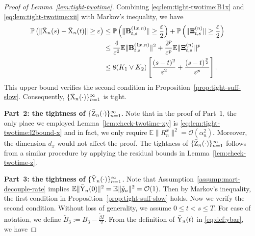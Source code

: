 \documentclass[11pt]{article}
\theoremstyle{plain}
\theoremstyle{definition}
\def\invdiffslow{\tilde{\beta}}
\def\eps{{\varepsilon}}
\def\mI{{\bm{I}}}
\def\OM{{\mathcal O}}
\def\EB{{\mathbb E}}
\def\PB{{\mathbb P}}
\newcommand{\ycheck}{{\check{y}}}
\newcommand{\xbar}{{\bar{\textnormal{X}}}}
\newcommand{\ybar}{{\bar{\textnormal{Y}}}}
\newcommand{\zbar}{{\bar{\textnormal{Z}}}}
\def\mI{{I}}
\def\Xii{\mbox{\boldmath$\Xi$\unboldmath}}
\def\bfB{{\bf B}}
\begin{document}
\begin{appendix}
\begin{proof}[Proof of Lemma~\ref{lem:tight-twotime}]
Combining \eqref{eq:lem:tight-twotime:B1x} and \eqref{eq:lem:tight-twotime:xii} with Markov's inequality, 
we have
\begin{align*}
    \PB \left( 
    \| \xbar_{n}(s) - \xbar_{n}(t) \| \ge \eps \right)
    & \le \PB \left( 
    \| \bfB^{(1x,n)}_{t,s} \| \ge \frac{\eps}{2} \right) + \PB \left( 
    \| \Xii^{(n)}_{t,s} \| \ge \frac{\eps}{2} \right) 
    \\
    & \le \frac{4}{\eps^2} \EB \| \bfB^{(1x,n)}_{t,s} \| ^2 + \frac{2^p}{\eps^p} \EB \| \Xii^{(n)}_{t,s} \|^p \\
    & 
    \le 8 (K_1 \vee K_2) \left[ \frac{ (s-t)^2 }{\eps^2} + \frac{ (s-t)^\frac{p}{2} }{\eps^p} \right].
\end{align*}
This upper bound verifies the second condition in Proposition~\ref{prop:tight-suff-slow}. Consequently, $\{ \xbar_{n}(\cdot) \}_{n=1}^\infty$ is tight.
\vspace{0.2cm}

\textbf{Part~2: the tightness of $\{ \zbar_{n}(\cdot) \}_{n=1}^\infty$}.
Note that in the proof of Part~1, the only place we employed Lemma~\ref{lem:check-twotime-xy} is \eqref{eq:lem:tight-twotime:l2bound-x} and in fact, we only require $\EB \| R_{n}^x \|^2 = \OM(\alpha_{n}^2)$. Moreover, the dimension $d_x$ would not affect the proof.
The tightness of $\{ \zbar_{n}(\cdot) \}_{n=1}^\infty$ follows from a similar procedure by applying the residual bounds in Lemma~\ref{lem:check-twotime-z}.
\vspace{0.2cm}

\textbf{Part~3: the tightness of $\{ \ybar_{n}(\cdot) \}_{n=1}^\infty$}.
Note that Assumption~\ref{assump:mart-decouple-rate} implies $\EB \| \ybar_{n}(0) \|^2 = \EB \| \ycheck_{n} \|^2 = \OM(1)$. 
Then by Markov's inequality, the first condition in Proposition~\ref{prop:tight-suff-slow} holds.
Now we verify the second condition.
Without loss of generality, we assume $0 \le t < s \le T$.
For ease of notation, we define $\widetilde{B}_3 := B_3 - \frac{\invdiffslow \mI}{2}$.
From the definition of $\ybar_{n}(t)$ in \eqref{eq:def:ybar}, we have


\end{proof}
\end{appendix}
\end{document}
